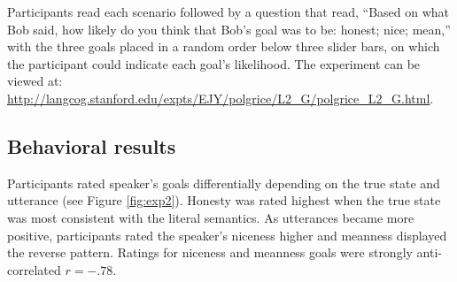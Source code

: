 \documentclass[10pt,letterpaper]{article}
\begin{document}
Participants read each scenario followed by a question that read, ``Based on what Bob said, how likely do you think that Bob's goal was to be: honest; nice; mean,'' with the three goals placed in a random order below three slider bars, on which the participant could indicate each goal's likelihood. 
The experiment can be viewed at: \url{http://langcog.stanford.edu/expts/EJY/polgrice/L2_G/polgrice_L2_G.html}.



\subsection{Behavioral results}


Participants rated speaker's goals differentially depending on the true state and utterance (see Figure \ref{fig:exp2}).
Honesty was rated highest when the true state was most consistent with the literal semantics. 
As utterances became more positive, participants rated the speaker's niceness higher and meanness displayed the reverse pattern. 
Ratings for niceness and meanness goals were strongly anti-correlated $r = -.78$.
\end{document}
